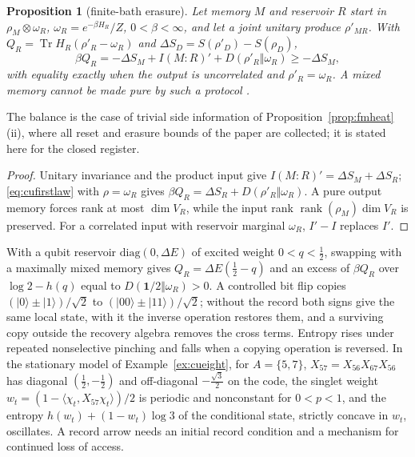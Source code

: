 \documentclass[aps,pra,onecolumn,superscriptaddress,nofootinbib,10pt]{revtex4-2}
\newtheorem{proposition}[theorem]{Proposition}
\theoremstyle{definition}
\theoremstyle{remark}
\newcommand{\rk}{\operatorname{rank}}
\newcommand{\tr}{\operatorname{Tr}}
\newcommand{\ip}[2]{\langle #1,#2\rangle}
\begin{document}
\begin{proposition}[finite-bath erasure]\label{prop:culandauer}
Let memory $M$ and reservoir $R$ start in $\rho_M\otimes\omega_R$, $\omega_R=e^{-\beta H_R}/Z$, $0<\beta<\infty$, and let a joint unitary produce $\rho'_{MR}$.
With $Q_R=\tr H_R(\rho'_R-\omega_R)$ and $\Delta S_D=S(\rho'_D)-S(\rho_D)$,
\[
\beta Q_R=-\Delta S_M+I(M{:}R)'+D(\rho'_R\Vert\omega_R)\ge-\Delta S_M ,
\]
with equality exactly when the output is uncorrelated and $\rho'_R=\omega_R$.  A mixed memory cannot be made pure by
such a protocol \cite{n1-landauer,n1-reeb}.
\end{proposition}
\noindent The balance is the case of trivial side information of Proposition~\ref{prop:fmheat}(ii), where all reset and erasure
bounds of the paper are collected; it is stated here for the closed register.
\begin{proof}
Unitary invariance and the product input give $I(M{:}R)'=\Delta S_M+\Delta S_R$; \eqref{eq:cufirstlaw} with $\rho=\omega_R$ gives
$\beta Q_R=\Delta S_R+D(\rho'_R\Vert\omega_R)$.  A pure output memory forces rank at most $\dim V_R$, while the input rank
$\rk(\rho_M)\dim V_R$ is preserved.  For a correlated input with reservoir marginal $\omega_R$, $I'-I$ replaces $I'$.
\end{proof}
\noindent With a qubit reservoir $\mathrm{diag}(0,\Delta E)$ of excited weight $0<q<\tfrac12$, swapping with a maximally mixed memory
gives $Q_R=\Delta E(\tfrac12-q)$ and an excess of $\beta Q_R$ over $\log2-h(q)$ equal to $D(\mathbf1/2\Vert\omega_R)>0$.  A controlled bit flip
copies $(\lvert0\rangle\pm\lvert1\rangle)/\sqrt2$ to $(\lvert00\rangle\pm\lvert11\rangle)/\sqrt2$; without the record both signs give the same local state, with it the
inverse operation restores them, and a surviving copy outside the recovery algebra removes the cross
terms.  Entropy rises under repeated nonselective pinching and falls when a copying operation is
reversed.  In the stationary model of Example~\ref{ex:cueight}, for $A=\{5,7\}$, $X_{57}=X_{56}X_{67}X_{56}$ has diagonal $(\tfrac12,-\tfrac12)$ and
off-diagonal $-\tfrac{\sqrt3}2$ on the code, the singlet weight $w_t=(1-\ip{\chi_t}{X_{57}\chi_t})/2$ is periodic and nonconstant for $0<p<1$,
and the entropy $h(w_t)+(1-w_t)\log3$ of the conditional state, strictly concave in $w_t$, oscillates.  A record arrow needs an
initial record condition and a mechanism for continued loss of access.
\end{document}

